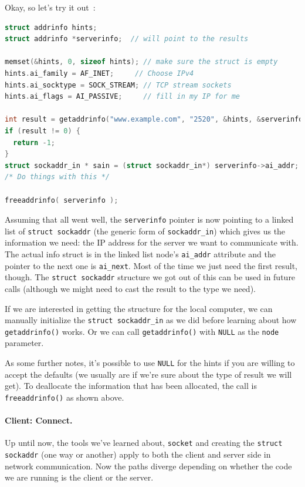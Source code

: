 Okay, so let's try it out~\cite{getaddrinfo}:

\begin{lstlisting}[language=C]
struct addrinfo hints;
struct addrinfo *serverinfo;  // will point to the results

memset(&hints, 0, sizeof hints); // make sure the struct is empty
hints.ai_family = AF_INET;     // Choose IPv4
hints.ai_socktype = SOCK_STREAM; // TCP stream sockets
hints.ai_flags = AI_PASSIVE;     // fill in my IP for me

int result = getaddrinfo("www.example.com", "2520", &hints, &serverinfo);
if (result != 0) {
  return -1;
}
struct sockaddr_in * sain = (struct sockaddr_in*) serverinfo->ai_addr;
/* Do things with this */

freeaddrinfo( serverinfo );
\end{lstlisting}

Assuming that all went well, the \texttt{serverinfo} pointer is now pointing to a linked list of \texttt{struct sockaddr} (the generic form of \texttt{sockaddr\_in}) which gives us the information we need: the IP address for the server we want to communicate with. The actual info struct is in the linked list node's \texttt{ai\_addr} attribute and the pointer to the next one is \texttt{ai\_next}. Most of the time we just need the first result, though. The \texttt{struct sockaddr} structure we got out of this can be used in future calls (although we might need to cast the result to the type we need). 

If we are interested in getting the structure for the local computer, we can manually initialize the \texttt{struct sockaddr\_in} as we did before learning about how \texttt{getaddrinfo()} works. Or we can call \texttt{getaddrinfo()} with \texttt{NULL} as the \texttt{node} parameter.

As some further notes, it's possible to use \texttt{NULL} for the hints if you are willing to accept the defaults (we usually are if we're sure about the type of result we will get). To deallocate the information that has been allocated, the call is \texttt{freeaddrinfo()} as shown above.

\paragraph{Client: Connect.}
Up until now, the tools we've learned about, \texttt{socket} and creating the \texttt{struct sockaddr} (one way or another) apply to both the client and server side in network communication. Now the paths diverge depending on whether the code we are running is the client or the server.

